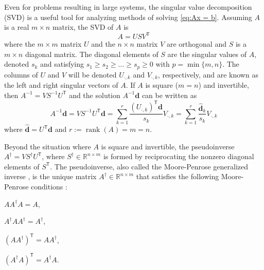 \documentclass[12pt]{article}
\newcommand{\dVec}{\mathbf{d}}	%
\newcommand{\trans}[1]{{#1}^\mathsf{T}}	%
\newcommand{\inv}[1]{{#1}^{-1}}	%
\newcommand{\pinv}[1]{{#1}^\dagger}	%
\DeclareMathOperator{\rank}{rank}	%
\newcommand{\singular}{s}	%
\newcommand{\svd}[1]{\widehat{#1}}	%
\begin{document}
Even for problems resulting in large systems, the singular value decomposition (SVD) is a useful tool for analyzing methods of solving \eqref{eq:Ax = b}.  Assuming $A$ is a real $m \times n$ matrix, the SVD of $A$ is
\begin{equation}
\label{eq:SVD}
A = US\trans{V}
\end{equation}
where the $m \times m$ matrix $U$ and the $n \times n$ matrix $V$ are orthogonal and $S$ is a $m \times n$ diagonal matrix. The diagonal elements of $S$ are the singular values of $A$, denoted $\singular_k$ and satisfying $\singular_1 \geq \singular_2 \geq \ldots \geq \singular_{p} \geq 0$ with $p = \min\{m,n\}$. The columns of $U$ and $V$ will be denoted $U_{\cdot,k}$ and $V_{\cdot,k}$, respectively, and are known as the left and right singular vectors of $A$. If $A$ is square ($m = n$) and invertible, then $\inv{A} = V\inv{S}\trans{U}$ and the solution $\inv{A}\dVec$ can be written as
\begin{equation}
\label{eq:InvProd}
\inv{A}\dVec = VS^{-1}{\trans{U}}\dVec = \sum_{k=1}^{r} \frac{{\trans{(U_{\cdot,k})}}\dVec}{\singular_k}V_{\cdot,k} = \sum_{k=1}^{r} \frac{\svd{\dVec}_k}{\singular_k}V_{\cdot,k}
\end{equation}
where $\svd{\dVec} = \trans{U}\dVec$ and $r := \rank(A) = m = n$. \par 
Beyond the situation where $A$ is square and invertible, the pseudoinverse $\pinv{A} = V\pinv{S}\trans{U}$, where $\pinv{S} \in \mathbb{R}^{n \times m}$ is formed by reciprocating the nonzero diagonal elements of $\trans{S}$. The pseudoinverse, also called the Moore-Penrose generalized inverse \cite{Penrose1955}, is the unique matrix $\pinv{A} \in \mathbb{R}^{n \times m}$ that satisfies the following Moore-Penrose conditions \cite[p.~290]{GolubVanLoan2013}:
\begin{enumerate}[label={(\Roman*)}]
    \begin{minipage}{0.45\linewidth}
        \centering
        \item $A\pinv{A}A = A$, \label{MP Condition 1}
        \item $\pinv{A}A\pinv{A} = \pinv{A}$, \label{MP Condition 2}
    \end{minipage}
    \begin{minipage}{0.45\linewidth}
        \centering
        \item $\trans{\left(A\pinv{A}\right)} = A\pinv{A}$, \label{MP Condition 3}
        \item $\trans{\left(\pinv{A}A\right)} = \pinv{A}A$. \label{MP Condition 4}
    \end{minipage}
\end{enumerate}
\end{document}
